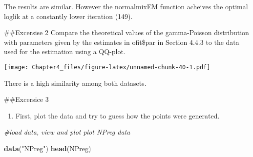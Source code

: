 \documentclass[]{article}
\newenvironment{Shaded}{\begin{snugshade}}{\end{snugshade}}
\newcommand{\CommentTok}[1]{\textcolor[rgb]{0.56,0.35,0.01}{\textit{#1}}}
\newcommand{\DataTypeTok}[1]{\textcolor[rgb]{0.13,0.29,0.53}{#1}}
\newcommand{\DecValTok}[1]{\textcolor[rgb]{0.00,0.00,0.81}{#1}}
\newcommand{\KeywordTok}[1]{\textcolor[rgb]{0.13,0.29,0.53}{\textbf{#1}}}
\newcommand{\NormalTok}[1]{#1}
\newcommand{\OperatorTok}[1]{\textcolor[rgb]{0.81,0.36,0.00}{\textbf{#1}}}
\newcommand{\StringTok}[1]{\textcolor[rgb]{0.31,0.60,0.02}{#1}}
\providecommand{\tightlist}{%
  \setlength{\itemsep}{0pt}\setlength{\parskip}{0pt}}
\begin{document}
The results are similar. However the normalmixEM function acheives the
optimal loglik at a constantly lower iteration (149).

\#\#Excersise 2 Compare the theoretical values of the gamma-Poisson
distribution with parameters given by the estimates in ofit\$par in
Section 4.4.3 to the data used for the estimation using a QQ-plot.

\begin{Shaded}
\end{Shaded}

\texttt{[image: Chapter4\_files/figure-latex/unnamed-chunk-40-1.pdf]}

There is a high similarity among both datasets.

\#\#Excersice 3

\begin{enumerate}
\def\labelenumi{\alph{enumi})}
\tightlist
\item
  First, plot the data and try to guess how the points were generated.
\end{enumerate}

\begin{Shaded}
\begin{Highlighting}[]
\CommentTok{#load data, view and plot plot NPreg data}

\KeywordTok{data}\NormalTok{(}\StringTok{"NPreg"}\NormalTok{)}
\KeywordTok{head}\NormalTok{(NPreg)}
\end{Highlighting}
\end{Shaded}
\end{document}
